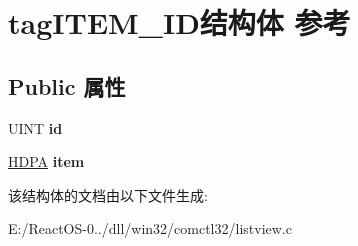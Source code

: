 \hypertarget{structtag_i_t_e_m___i_d}{}\section{tag\+I\+T\+E\+M\+\_\+\+I\+D结构体 参考}
\label{structtag_i_t_e_m___i_d}
\subsection*{Public 属性}
\begin{DoxyCompactItemize}
\item 
\mbox{\label{structtag_i_t_e_m___i_d_aa5e7b6aeac51d4c2ad9b6aa0570de961}} 
U\+I\+NT {\bfseries id}
\item 
\mbox{\label{structtag_i_t_e_m___i_d_a9b040da52d84dbab96bdac3af9f8b541}} 
\hyperlink{struct___d_p_a}{H\+D\+PA} {\bfseries item}
\end{DoxyCompactItemize}


该结构体的文档由以下文件生成\+:\begin{DoxyCompactItemize}
\item 
E\+:/\+React\+O\+S-\/0../dll/win32/comctl32/listview.\+c\end{DoxyCompactItemize}
